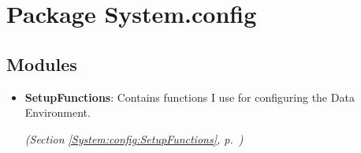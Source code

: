 %
%
%


\section{Package System.config}

    \label{System:config}


\subsection{Modules}

\begin{itemize}
\setlength{\parskip}{0ex}
\item \textbf{SetupFunctions}: Contains functions I use for configuring the  Data Environment.



  \textit{(Section \ref{System:config:SetupFunctions}, p.~\pageref{System:config:SetupFunctions})}

\end{itemize}

